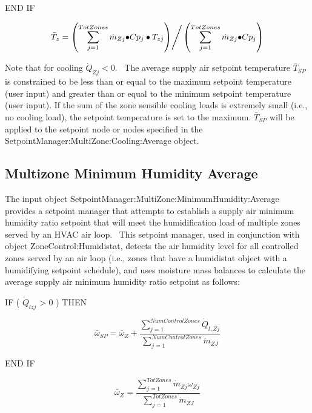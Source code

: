 END IF

\begin{equation}
{\bar T_z} = {{\left( {\sum\limits_{j = 1}^{TotZones} {{{\dot m}_{Zj}} \bullet } C{p_j} \bullet {T_{zj}}} \right)} \mathord{\left/ {\vphantom {{\left( {\sum\limits_{j = 1}^{TotZones} {{{\dot m}_{Zj}} \bullet } C{p_j} \bullet {T_{zj}}} \right)} {\left( {\sum\limits_{j = 1}^{TotZones} {{{\dot m}_{Zj}} \bullet } C{p_j}} \right)}}} \right. } {\left( {\sum\limits_{j = 1}^{TotZones} {{{\dot m}_{Zj}} \bullet } C{p_j}} \right)}}
\end{equation}

Note that for cooling \({\dot Q_{Zj}} < 0.\) ~The average supply air setpoint temperature \({\bar T_{SP}}\) is constrained to be less than or equal to the maximum setpoint temperature (user input) and greater than or equal to the minimum setpoint temperature (user input). If the sum of the zone sensible cooling loads is extremely small (i.e., no cooling load), the setpoint temperature is set to the maximum. \({\bar T_{SP}}\) will be applied to the setpoint node or nodes specified in the SetpointManager:MultiZone:Cooling:Average object.

\subsection{Multizone Minimum Humidity Average}\label{multizone-minimum-humidity-average}

The input object SetpointManager:MultiZone:MinimumHumidity:Average provides a setpoint manager that attempts to establish a supply air minimum humidity ratio setpoint that will meet the humidification load of multiple zones served by an HVAC air loop.~ This setpoint manager, used in conjunction with object ZoneControl:Humidistat, detects the air humidity level for all controlled zones served by an air loop (i.e., zones that have a humidistat object with a humidifying setpoint schedule), and uses moisture mass balances to calculate the average supply air minimum humidity ratio setpoint as follows:

IF ( \({\dot Q_{lzj}}\) \textgreater{} 0 ) THEN

\begin{equation}
  \bar{\omega}_{SP} = \bar{\omega}_Z + \frac{\sum\limits_{j = 1}^{NumControlZones}\dot{Q}_{l,Zj}}{\sum\limits_{j = 1}^{NumControlZones}\dot{m}_{ZJ}}
\end{equation}

END IF

\begin{equation}
  \bar{\omega}_{Z} = \frac{\sum\limits_{j = 1}^{TotZones}\dot{m}_{Zj}\omega_{Zj}}{\sum\limits_{j = 1}^{TotZones}\dot{m}_{ZJ}}
\end{equation}

